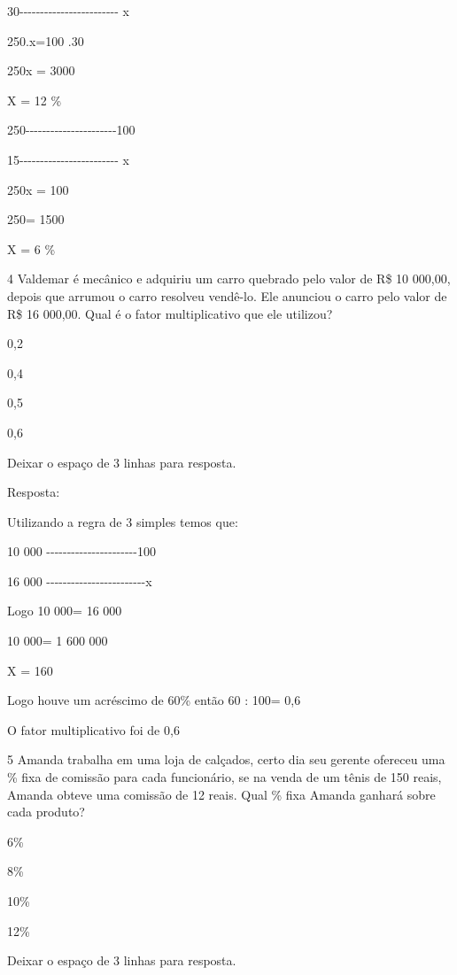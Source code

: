 30-\/-\/-\/-\/-\/-\/-\/-\/-\/-\/-\/-\/-\/-\/-\/-\/-\/-\/-\/-\/-\/-\/-\/-
x

250.x=100 .30

250x = 3000

X = 12 \%

250-\/-\/-\/-\/-\/-\/-\/-\/-\/-\/-\/-\/-\/-\/-\/-\/-\/-\/-\/-\/-\/-100

15-\/-\/-\/-\/-\/-\/-\/-\/-\/-\/-\/-\/-\/-\/-\/-\/-\/-\/-\/-\/-\/-\/-\/-
x

250x = 100

250\times = 1500

X = 6 \%

\num{4} Valdemar é mecânico e adquiriu um carro quebrado pelo valor de R\$ 10
000,00, depois que arrumou o carro resolveu vendê-lo. Ele anunciou o
carro pelo valor de R\$ 16 000,00. Qual é o fator multiplicativo que ele
utilizou?

\item 0,2
\item 0,4
\item 0,5
\item 0,6

Deixar o espaço de 3 linhas para resposta.

Resposta:

Utilizando a regra de 3 simples temos que:

10 000
-\/-\/-\/-\/-\/-\/-\/-\/-\/-\/-\/-\/-\/-\/-\/-\/-\/-\/-\/-\/-\/-100

16 000
-\/-\/-\/-\/-\/-\/-\/-\/-\/-\/-\/-\/-\/-\/-\/-\/-\/-\/-\/-\/-\/-\/-\/-x

Logo 10 000\times \times = 16 000

10 000\times = 1 600 000

X = 160

Logo houve um acréscimo de 60\% então 60 : 100= 0,6

O fator multiplicativo foi de 0,6

\num{5} Amanda trabalha em uma loja de calçados, certo dia seu gerente
ofereceu uma \% fixa de comissão para cada funcionário, se na venda de
um tênis de 150 reais, Amanda obteve uma comissão de 12 reais. Qual \%
fixa Amanda ganhará sobre cada produto?

\item 6\%
\item 8\%
\item 10\%
\item 12\%

Deixar o espaço de 3 linhas para resposta.

